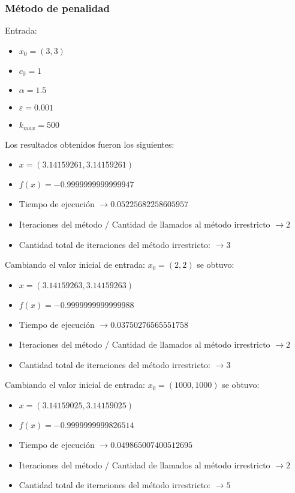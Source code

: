 \documentclass[titlepage, 11pt]{scrartcl}
\begin{document}
	\subsubsection{Método de penalidad}
	Entrada:
	\begin{itemize}
		\item $x_0 = (3, 3)$
		\item $c_0 = 1$
		\item $\alpha = 1.5$
		\item $\varepsilon = 0.001$
		\item $k_{max} = 500$
	\end{itemize}
	Los resultados obtenidos fueron los siguientes:
	\begin{itemize}
		\item $x = (3.14159261, 3.14159261)$
		\item $f(x) = -0.9999999999999947$
		\item Tiempo de ejecución $\rightarrow 0.05225682258605957$
		\item Iteraciones del método / Cantidad de llamados al método irrestricto $\rightarrow 2$
		\item Cantidad total de iteraciones del método irrestricto: $\rightarrow 3$
	\end{itemize}

	Cambiando el valor inicial de entrada: $x_0 = (2, 2)$ se obtuvo:
		\begin{itemize}
		\item $x = (3.14159263, 3.14159263)$
		\item $f(x) = -0.9999999999999988$
		\item Tiempo de ejecución $\rightarrow 0.03750276565551758$
		\item Iteraciones del método / Cantidad de llamados al método irrestricto $\rightarrow 2$
		\item Cantidad total de iteraciones del método irrestricto: $\rightarrow 3$
	\end{itemize}
	Cambiando el valor inicial de entrada: $x_0 = (1000, 1000)$ se obtuvo:
	\begin{itemize}
		\item $x = (3.14159025, 3.14159025)$
		\item $f(x) = -0.9999999999826514$
		\item Tiempo de ejecución $\rightarrow 0.049865007400512695$
		\item Iteraciones del método / Cantidad de llamados al método irrestricto $\rightarrow 2$
		\item Cantidad total de iteraciones del método irrestricto: $\rightarrow 5$
	\end{itemize}
\end{document}
